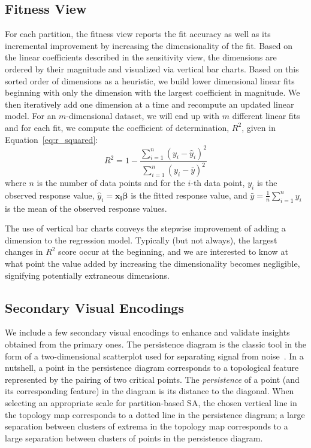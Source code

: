 \subsection{Fitness View}
\label{sec:fitnessView}
For each partition, the fitness view reports the fit accuracy as well as its incremental improvement by increasing the dimensionality of the fit.
%
Based on the linear coefficients described in the sensitivity view, the dimensions are ordered by their magnitude and visualized via vertical bar charts.
%
Based on this sorted order of dimensions as a heuristic, we build lower dimensional linear fits beginning with only the dimension with the largest coefficient in magnitude.
%
We then iteratively add one dimension at a time and recompute an updated linear model.
%
For an $m$-dimensional dataset, we will end up with $m$ different linear fits and for each fit, we compute the coefficient of determination, $R^2$, given in Equation~\ref{eq:r_squared}:
%
\begin{equation}
    R^2 = 1 - \frac{\sum_{i=1}^n ( y_i - \hat{y}_i)^2}{\sum_{i=1}^n ( y_i - \bar{y})^2}
    \label{eq:r_squared}
\end{equation}
%
where $n$ is the number of data points and for the $i$-th data point, $y_i$ is the observed response value, $\hat{y}_i = \mathbf{x_{i}}\boldsymbol\beta$ is the fitted response value, and $\bar{y} = \frac{1}{n}\sum_{i=1}^{n}y_i$ is the mean of the observed response values.

The use of vertical bar charts conveys the stepwise improvement of adding a dimension to the regression model.
%
Typically (but not always), the largest changes in $R^2$ score occur at the beginning, and we are interested to know at what point the value added by increasing the dimensionality becomes negligible, signifying potentially extraneous dimensions.

\subsection{Secondary Visual Encodings}
\label{sec:otherViews}
We include a few secondary visual encodings to enhance and validate insights obtained from the primary ones.
%
The persistence diagram is the classic tool in the form of a two-dimensional scatterplot used for separating signal from noise~\cite{EdelsbrunnerHarer2008}.
%
In a nutshell, a point in the persistence diagram corresponds to a topological feature represented by the pairing of two critical points.
%
The \emph{persistence} of a point (and its corresponding feature) in the diagram is  its distance to the diagonal.
%
When selecting an appropriate scale for partition-based SA, the chosen vertical line in the topology map corresponds to a dotted line in the persistence diagram; a large separation between clusters of extrema in the topology map corresponds to a large separation between clusters of points in the persistence diagram.

